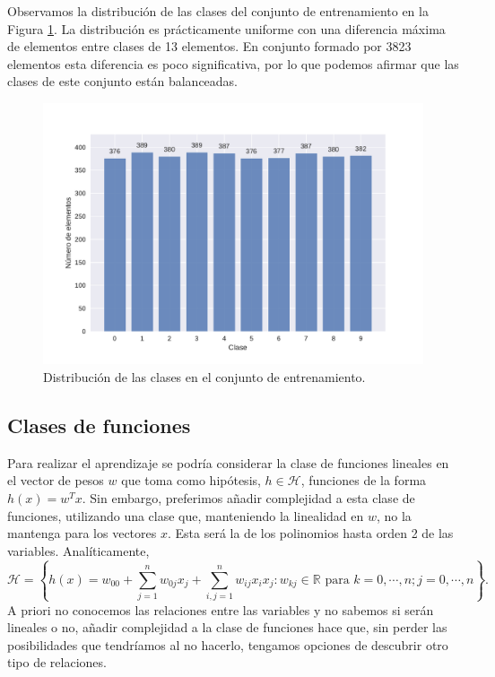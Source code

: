 \documentclass[a4paper, 20pt]{article}
\begin{document}
{Observamos la distribución de las clases del conjunto de entrenamiento en la Figura \ref{fig:histdigs}. La distribución es prácticamente uniforme con una diferencia máxima de elementos entre clases de 13 elementos. En conjunto formado por 3823 elementos esta diferencia es poco significativa, por lo que podemos afirmar que las clases de este conjunto están balanceadas.

\begin{figure}[H]
    \centering
    \includegraphics[width=1\textwidth]{HistDigits}
    \caption{Distribución de las clases en el conjunto de entrenamiento.}
    \label{fig:histdigs}
\end{figure}

\subsection{Clases de funciones}

Para realizar el aprendizaje se podría considerar la clase de funciones lineales en el vector de pesos $w$ que toma como hipótesis, $h\in \mathcal{H}$, funciones de la forma $h(x) = w^Tx$. Sin embargo, preferimos añadir complejidad a esta clase de funciones, utilizando una clase que, manteniendo la linealidad en $w$, no la mantenga para los vectores $x$. Esta será la de los polinomios hasta orden 2 de las variables. Analíticamente, \[
\mathcal{H} = \left \{ h(x) = w_{00} +\sum_{j=1}^nw_{0j}x_j + \sum_{i,j = 1}^nw_{ij} x_ix_j: w_{kj} \in \mathbb{R} \text{ para } k = 0,\cdots, n; j=0,\cdots,n\right\}.
\]
A priori no conocemos las relaciones entre las variables y no sabemos si serán lineales o no, añadir complejidad a la clase de funciones hace que, sin perder las posibilidades que tendríamos al no hacerlo, tengamos opciones de descubrir otro tipo de relaciones.

}
\end{document}
